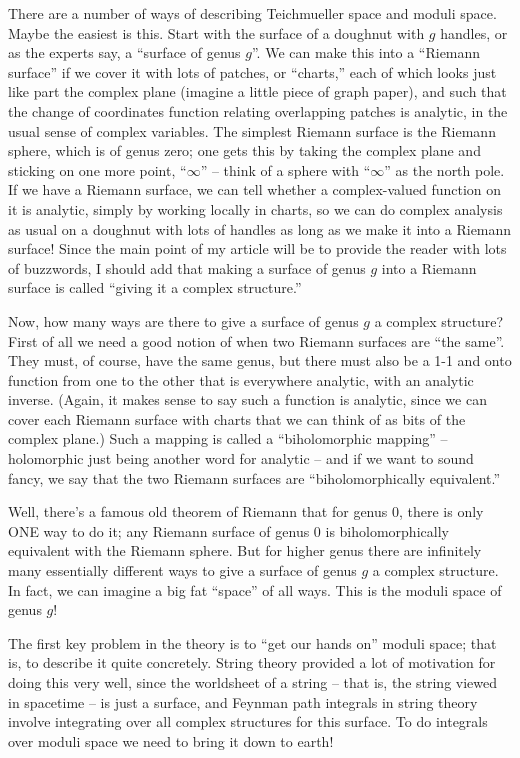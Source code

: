 \documentclass{article}
\begin{document}
There are a number of ways of describing Teichmueller space and moduli
space. Maybe the easiest is this. Start with the surface of a doughnut
with \(g\) handles, or as the experts say, a ``surface of genus \(g\)''.
We can make this into a ``Riemann surface'' if we cover it with lots of
patches, or ``charts,'' each of which looks just like part the complex
plane (imagine a little piece of graph paper), and such that the change
of coordinates function relating overlapping patches is analytic, in the
usual sense of complex variables. The simplest Riemann surface is the
Riemann sphere, which is of genus zero; one gets this by taking the
complex plane and sticking on one more point, ``\(\infty\)'' -- think of
a sphere with ``\(\infty\)'' as the north pole. If we have a Riemann
surface, we can tell whether a complex-valued function on it is
analytic, simply by working locally in charts, so we can do complex
analysis as usual on a doughnut with lots of handles as long as we make
it into a Riemann surface! Since the main point of my article will be to
provide the reader with lots of buzzwords, I should add that making a
surface of genus \(g\) into a Riemann surface is called ``giving it a
complex structure.''

Now, how many ways are there to give a surface of genus \(g\) a complex
structure? First of all we need a good notion of when two Riemann
surfaces are ``the same''. They must, of course, have the same genus,
but there must also be a 1-1 and onto function from one to the other
that is everywhere analytic, with an analytic inverse. (Again, it makes
sense to say such a function is analytic, since we can cover each
Riemann surface with charts that we can think of as bits of the complex
plane.) Such a mapping is called a ``biholomorphic mapping'' --
holomorphic just being another word for analytic -- and if we want to
sound fancy, we say that the two Riemann surfaces are
``biholomorphically equivalent.''

Well, there's a famous old theorem of Riemann that for genus 0, there is
only ONE way to do it; any Riemann surface of genus 0 is
biholomorphically equivalent with the Riemann sphere. But for higher
genus there are infinitely many essentially different ways to give a
surface of genus \(g\) a complex structure. In fact, we can imagine a
big fat ``space'' of all ways. This is the moduli space of genus \(g\)!

The first key problem in the theory is to ``get our hands on'' moduli
space; that is, to describe it quite concretely. String theory provided
a lot of motivation for doing this very well, since the worldsheet of a
string -- that is, the string viewed in spacetime -- is just a surface,
and Feynman path integrals in string theory involve integrating over all
complex structures for this surface. To do integrals over moduli space
we need to bring it down to earth!
\end{document}
